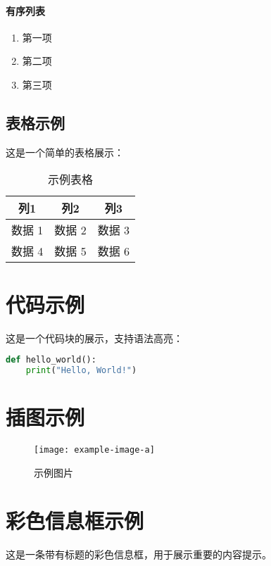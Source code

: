 \paragraph{有序列表}
\begin{enumerate}
    \item 第一项
    \item 第二项
    \item 第三项
\end{enumerate}

\subsection{表格示例}

这是一个简单的表格展示：

\begin{table}[htbp]
\centering
\caption{示例表格}
\begin{tabular}{|c|c|c|}
\hline
\textbf{列1} & \textbf{列2} & \textbf{列3} \\ \hline
数据 1      & 数据 2      & 数据 3      \\ \hline
数据 4      & 数据 5      & 数据 6      \\ \hline
\end{tabular}
\end{table}

\newpage

\section{代码示例}

这是一个代码块的展示，支持语法高亮：

\begin{lstlisting}[language=Python, caption=Python 代码示例]
def hello_world():
    print("Hello, World!")
\end{lstlisting}

\newpage

\section{插图示例}

\begin{figure}[htbp]
\centering
\texttt{[image: example-image-a]}
\caption{示例图片}
\end{figure}

\newpage

\section{彩色信息框示例}

\begin{info}[重要信息]
    这是一条带有标题的彩色信息框，用于展示重要的内容提示。
\end{info}